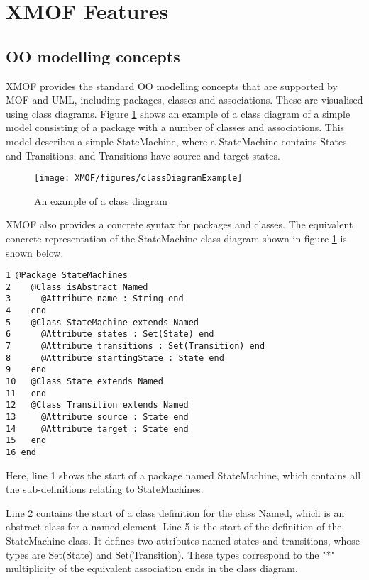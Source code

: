 \section{XMOF Features}

\subsection{OO modelling concepts}

XMOF provides the standard OO modelling concepts that are
supported by MOF and UML, including packages, classes and
associations. These are  visualised using class diagrams. Figure
\ref{classDiagram} shows an example of a class diagram of a simple
model consisting of a package with a number of classes and
associations. This model describes a simple StateMachine, where a
StateMachine contains States and Transitions, and Transitions have
source and target states.

\begin{figure}[htb]
\begin{center}
\texttt{[image: XMOF/figures/classDiagramExample]}
\caption{An example of a class diagram}
\label{classDiagram}
\end{center}
\end{figure}

XMOF also provides a concrete syntax for packages and classes. The
equivalent concrete representation of the StateMachine class
diagram shown in figure \ref{classDiagram} is shown below.

\small
\begin{verbatim}
1 @Package StateMachines
2    @Class isAbstract Named
3      @Attribute name : String end
4    end
5    @Class StateMachine extends Named
6      @Attribute states : Set(State) end
7      @Attribute transitions : Set(Transition) end
8      @Attribute startingState : State end
9    end
10   @Class State extends Named
11   end
12   @Class Transition extends Named
13     @Attribute source : State end
14     @Attribute target : State end
15   end
16 end
\end{verbatim}

\normalsize

Here, line 1 shows the start of a package named StateMachine,
which contains all the sub-definitions relating to StateMachines.

Line 2 contains the start of a class definition for the class
Named,  which is an abstract class for a named element. Line 5 is
the start of the definition of the StateMachine class. It defines
two attributes named states and transitions, whose types are
Set(State) and Set(Transition). These types correspond to the "*"
multiplicity of the equivalent association ends in the class
diagram.

